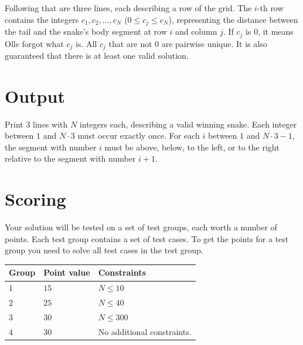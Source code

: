 Following that are three lines, each describing a row of the grid. 
The $i$-th row contains the integers $c_1, c_2, \dots, c_N$ ($0 \leq c_j \leq c_N$), 
representing the distance between the tail and the snake's body segment at 
row $i$ and column $j$. If $c_j$ is $0$, it means Olle forgot what $c_j$ is. 
All $c_j$ that are not $0$ are pairwise unique. It is also guaranteed that there is at least one valid solution.

\section*{Output}
\noindent
Print $3$ lines with $N$ integers each, describing a valid winning snake. 
Each integer between $1$ and $N \cdot 3$ must occur exactly once. 
For each $i$ between $1$ and $N \cdot 3 - 1$, the segment with number $i$ must be above, 
below, to the left, or to the right relative to the segment with number $i+1$.

\section*{Scoring}
Your solution will be tested on a set of test groups, each worth a number of points. 
Each test group contains a set of test cases. 
To get the points for a test group you need to solve all test cases in the test group.

\noindent
\begin{tabular}{| l | l | p{12cm} |}
  \hline
  \textbf{Group} & \textbf{Point value} & \textbf{Constraints} \\ \hline
  $1$    & $15$         & $N \leq 10$  \\ \hline
  $2$    & $25$         & $N \leq 40$ \\ \hline
  $3$    & $30$         & $N \leq 300$ \\ \hline
  $4$    & $30$         & No additional constraints. \\ \hline
\end{tabular}
